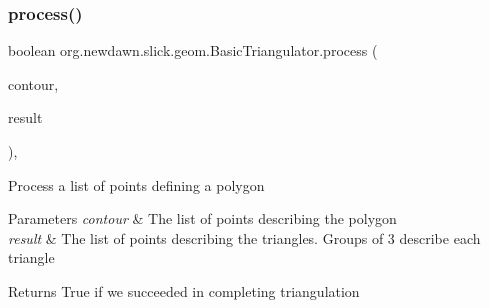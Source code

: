 \subsubsection{\texorpdfstring{process()}{process()}}
{\footnotesize\ttfamily boolean org.\+newdawn.\+slick.\+geom.\+Basic\+Triangulator.\+process (\begin{DoxyParamCaption}\item[{\mbox{\hyperlink{classorg_1_1newdawn_1_1slick_1_1geom_1_1_basic_triangulator_1_1_point_list}{Point\+List}}}]{contour,  }\item[{\mbox{\hyperlink{classorg_1_1newdawn_1_1slick_1_1geom_1_1_basic_triangulator_1_1_point_list}{Point\+List}}}]{result }\end{DoxyParamCaption})\hspace{0.3cm}{\ttfamily [inline]}, {\ttfamily [private]}}

Process a list of points defining a polygon 
\begin{DoxyParams}{Parameters}
{\em contour} & The list of points describing the polygon \\
\hline
{\em result} & The list of points describing the triangles. Groups of 3 describe each triangle\\
\hline
\end{DoxyParams}
\begin{DoxyReturn}{Returns}
True if we succeeded in completing triangulation 
\end{DoxyReturn}

